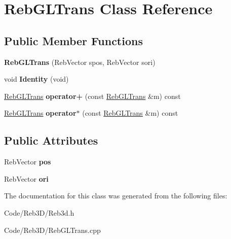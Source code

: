\hypertarget{class_reb_g_l_trans}{}\section{Reb\+G\+L\+Trans Class Reference}
\label{class_reb_g_l_trans}
\subsection*{Public Member Functions}
\begin{DoxyCompactItemize}
\item 
{\bfseries Reb\+G\+L\+Trans} (Reb\+Vector spos, Reb\+Vector sori)\hypertarget{class_reb_g_l_trans_ae75dc1d0e5fb16f5e642ac9aabe25deb}{}\label{class_reb_g_l_trans_ae75dc1d0e5fb16f5e642ac9aabe25deb}

\item 
void {\bfseries Identity} (void)\hypertarget{class_reb_g_l_trans_ada1127db726181197bac6b646a58cdc2}{}\label{class_reb_g_l_trans_ada1127db726181197bac6b646a58cdc2}

\item 
\hyperlink{class_reb_g_l_trans}{Reb\+G\+L\+Trans} {\bfseries operator+} (const \hyperlink{class_reb_g_l_trans}{Reb\+G\+L\+Trans} \&m) const \hypertarget{class_reb_g_l_trans_a7b6131dd0f8bcc17f6370a7de796f50c}{}\label{class_reb_g_l_trans_a7b6131dd0f8bcc17f6370a7de796f50c}

\item 
\hyperlink{class_reb_g_l_trans}{Reb\+G\+L\+Trans} {\bfseries operator$\ast$} (const \hyperlink{class_reb_g_l_trans}{Reb\+G\+L\+Trans} \&m) const \hypertarget{class_reb_g_l_trans_a81195b78ee3530d2e7f7606b33c66a77}{}\label{class_reb_g_l_trans_a81195b78ee3530d2e7f7606b33c66a77}

\end{DoxyCompactItemize}
\subsection*{Public Attributes}
\begin{DoxyCompactItemize}
\item 
Reb\+Vector {\bfseries pos}\hypertarget{class_reb_g_l_trans_a2c4c1f57810c86f6e6a2dac98c2aeac2}{}\label{class_reb_g_l_trans_a2c4c1f57810c86f6e6a2dac98c2aeac2}

\item 
Reb\+Vector {\bfseries ori}\hypertarget{class_reb_g_l_trans_a58bcea683775fa07f4306ed012a19bbf}{}\label{class_reb_g_l_trans_a58bcea683775fa07f4306ed012a19bbf}

\end{DoxyCompactItemize}


The documentation for this class was generated from the following files\+:\begin{DoxyCompactItemize}
\item 
Code/\+Reb3\+D/Reb3d.\+h\item 
Code/\+Reb3\+D/Reb\+G\+L\+Trans.\+cpp\end{DoxyCompactItemize}
